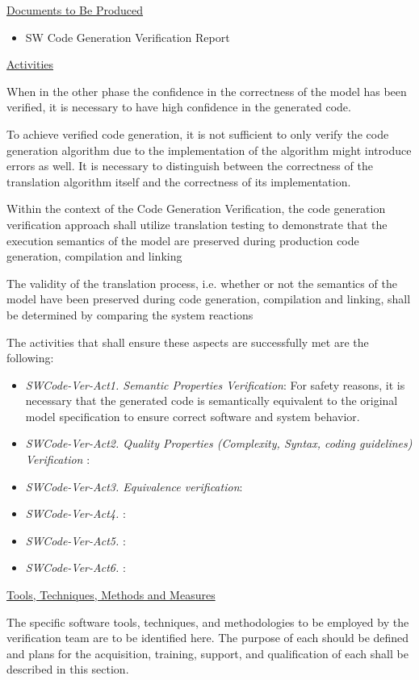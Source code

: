 \documentclass{template/openetcs_report}
\begin{document}
\underline{Documents to Be Produced} 

\begin{itemize}
\item SW Code Generation Verification Report
\end{itemize}

\underline{Activities}

When in the other phase the confidence in the correctness of the model has been verified, it is necessary to have high confidence in the generated code.

To achieve verified code generation, it is not sufficient
to only verify the code generation algorithm due to the implementation of the algorithm might introduce errors as well. It is necessary to distinguish between the correctness of the translation algorithm itself and the
correctness of its implementation.

Within the context of the Code Generation Verification, the code generation verification approach shall utilize translation testing to demonstrate
that the execution semantics of the model are preserved during production
code generation, compilation and linking

The validity of the translation process, i.e. whether or not the semantics
of the model have been preserved during code generation, compilation and linking, shall be determined by comparing the system reactions

The activities that shall ensure these aspects are successfully met are the following:
\begin{itemize}
\item {\it SWCode-Ver-Act1. Semantic Properties Verification}: For safety reasons, it is necessary that the generated code is semantically equivalent to the original model specification to ensure correct software and system behavior.


\item {\it SWCode-Ver-Act2. Quality Properties (Complexity, Syntax, coding guidelines) Verification }:  
\item {\it SWCode-Ver-Act3. Equivalence verification}: 
\item {\it SWCode-Ver-Act4. }:  
\item {\it SWCode-Ver-Act5.  }:  
\item {\it SWCode-Ver-Act6.  }:   
\end{itemize}

\underline{Tools, Techniques, Methods and Measures} 

The specific software tools, techniques, and methodologies to be
employed by the verification team are to be identified here. 
The purpose of each should be defined and plans for the acquisition,
training, support, and qualification of each shall be described in
this section. 
\end{document}

